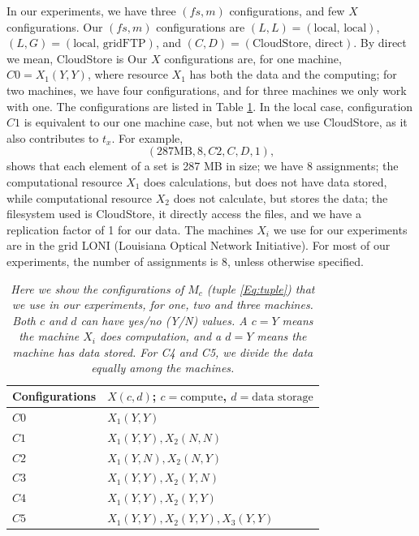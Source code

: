 \documentclass{rspublic}
\begin{document}
In our experiments, we have three $(fs, m)$ configurations, and few $X$
configurations. Our $(fs, m)$ configurations are $(L,L)=(\mbox{local,
local})$, $(L,G)=(\mbox{local, gridFTP})$, and $(C,D)=(\mbox{CloudStore,
direct})$. By direct we mean, CloudStore is  Our $X$ configurations are,
for one machine, $C0=X_1(Y,Y)$, where resource $X_1$ has both the data
and the computing; for two machines, we have four configurations, and
for three machines we only work with one. The configurations are listed
in Table \ref{Tab:Configs}. In the local case, configuration $C1$ is
equivalent to our one machine case, but not when we use CloudStore, as
it also contributes to $t_x$. For example, 
 \begin{equation}
(287 \mbox{MB}, 8, C2, C, D, 1),
\end{equation}
shows that each element of a set is 287 MB in size; we have 8
assignments; the computational resource $X_1$ does calculations, but
does not have data stored, while computational resource $X_2$ does not
calculate, but stores the data; the filesystem used is CloudStore, it
directly access the files, and we have a replication factor of 1 for our
data. The machines $X_i$ we use for our experiments are in the grid LONI
(Louisiana Optical Network Initiative). For most of our experiments, the
number of assignments is 8, unless otherwise specified.

\begin{table}
\begin{center}
    \begin{tabular}{ | l | l |}
    \hline
    Configurations & $X(c,d)$; $c= \mbox{compute}$, $d=\mbox{data storage}$  \\ \hline
    $C0$ & $X_1(Y,Y)$  \\ \hline    
    $C1$ & $X_1(Y,Y), X_2(N, N)$  \\ \hline
    $C2$ & $X_1(Y,N), X_2(N,Y)$ \\ \hline
    $C3$ & $X_1(Y,Y), X_2(Y,N)$ \\ \hline
    $C4$ & $X_1(Y,Y), X_2(Y,Y)$ \\ \hline
    $C5$ & $X_1(Y,Y), X_2(Y,Y), X_3(Y,Y)$ \\ 
    \hline
    \end{tabular}
\end{center}
    \caption{\textit{Here we show the configurations of $M_c$ (tuple
\ref{Eq:tuple}) that we use in our experiments, for one, two and three
machines. Both $c$ and $d$ can have yes/no (Y/N) values. A $c = Y$ means
the machine $X_i$ does computation, and a $d = Y$ means the machine has
data stored. For C4 and C5, we divide the data equally among the
machines.}}
    \label{Tab:Configs}
\end{table}
\end{document}
